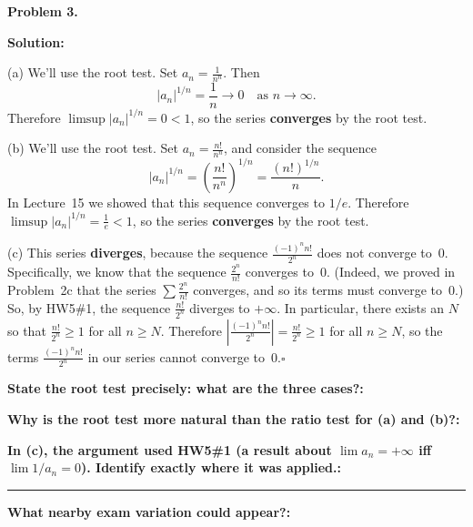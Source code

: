 \documentclass[12pt]{article}
\newcommand{\fillfield}[1]{%
  \par\noindent\textbf{#1:}\enspace\hrulefill\par\vspace{3pt}%
}
\newcommand{\fillfieldlong}[1]{%
  \par\noindent\textbf{#1:}\par\vspace{1.5cm}%
  \noindent\rule{\linewidth}{0.35pt}\par\vspace{4pt}%
}
\begin{document}
\begin{tcolorbox}[
  enhanced, breakable,
  colback  = solgreen,
  colframe = green!45!black,
  fonttitle = \bfseries,
  title = {\textsc{Official Solution}\hfill Homework 7 -- Solutions}
]
\textbf{Problem 3.}

\medskip\textbf{Solution:}

\medskip
(a) We'll use the root test. Set $a_n = \frac{1}{n^n}$. Then
\[
  |a_n|^{1/n} = \frac{1}{n} \to 0 \quad\text{as } n\to\infty.
\]
Therefore $\limsup|a_n|^{1/n} = 0 < 1$, so the series \textbf{converges} by the root test.

\medskip
(b) We'll use the root test. Set $a_n = \frac{n!}{n^n}$, and consider the sequence
\[
  |a_n|^{1/n} = \left(\frac{n!}{n^n}\right)^{1/n} = \frac{(n!)^{1/n}}{n}.
\]
In Lecture~15 we showed that this sequence converges to $1/e$.
Therefore $\limsup|a_n|^{1/n} = \frac{1}{e} < 1$, so the series \textbf{converges}
by the root test.

\medskip
(c) This series \textbf{diverges}, because the sequence $\frac{(-1)^n n!}{2^n}$ does not
converge to~$0$.
Specifically, we know that the sequence $\frac{2^n}{n!}$ converges to~$0$.
(Indeed, we proved in Problem~2c that the series $\sum \frac{2^n}{n!}$ converges, and so
its terms must converge to~$0$.)
So, by HW5\#1, the sequence $\frac{n!}{2^n}$ diverges to $+\infty$.
In particular, there exists an $N$ so that $\frac{n!}{2^n} \geq 1$ for all $n \geq N$.
Therefore $\left|\frac{(-1)^n n!}{2^n}\right| = \frac{n!}{2^n} \geq 1$ for all $n \geq N$,
so the terms $\frac{(-1)^n n!}{2^n}$ in our series cannot converge to~$0$.\hfill$\square$
\end{tcolorbox}

\bigskip

\begin{tcolorbox}[
  enhanced, breakable,
  colback  = reflectcyan,
  colframe = cyan!55!black,
  fonttitle = \bfseries,
  title = {\textsc{Reflection \& Variation}}
]
\fillfield{State the root test precisely: what are the three cases?}
\fillfield{Why is the root test more natural than the ratio test for (a) and (b)?}
\fillfieldlong{In (c), the argument used HW5\#1 (a result about $\lim a_n = +\infty$ iff $\lim 1/a_n = 0$). Identify exactly where it was applied.}
\fillfield{What nearby exam variation could appear?}
\end{tcolorbox}

\newpage
\end{document}
